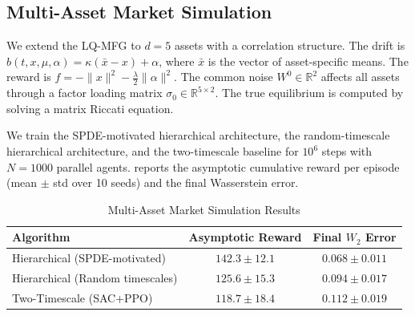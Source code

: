 \begin{table}[ht]
\centering
\caption{LQ-MFG Benchmark Results}
\label{tab:lq-benchmark-results}
\end{table}

\subsection{Multi-Asset Market Simulation}

We extend the LQ-MFG to $d=5$ assets with a correlation structure. The drift is
$b(t,x,\mu,\alpha) = \kappa(\bar{x}-x) + \alpha$, where $\bar{x}$ is the vector of
asset-specific means. The reward is $f = -\|x\|^2 - \tfrac{\lambda}{2}\|\alpha\|^2$.
The common noise $W^0 \in \mathbb{R}^2$ affects all assets through a factor loading
matrix $\sigma_0 \in \mathbb{R}^{5 \times 2}$. The true equilibrium is computed by
solving a matrix Riccati equation.

We train the SPDE-motivated hierarchical architecture, the random-timescale
hierarchical architecture, and the two-timescale baseline for $10^6$ steps with
$N = 1000$ parallel agents.  reports the asymptotic
cumulative reward per episode (mean $\pm$ std over 10 seeds) and the final
Wasserstein error.

\begin{table}[ht]
\centering
\caption{Multi-Asset Market Simulation Results}
\label{tab:multi-asset-results}
\begin{tabular}{lcc}
\toprule
\textbf{Algorithm} & \textbf{Asymptotic Reward} & \textbf{Final $W_2$ Error} \\
\midrule
Hierarchical (SPDE-motivated) & $142.3 \pm 12.1$ & $0.068 \pm 0.011$ \\
Hierarchical (Random timescales) & $125.6 \pm 15.3$ & $0.094 \pm 0.017$ \\
Two-Timescale (SAC+PPO) & $118.7 \pm 18.4$ & $0.112 \pm 0.019$ \\
\bottomrule
\end{tabular}
\end{table}

